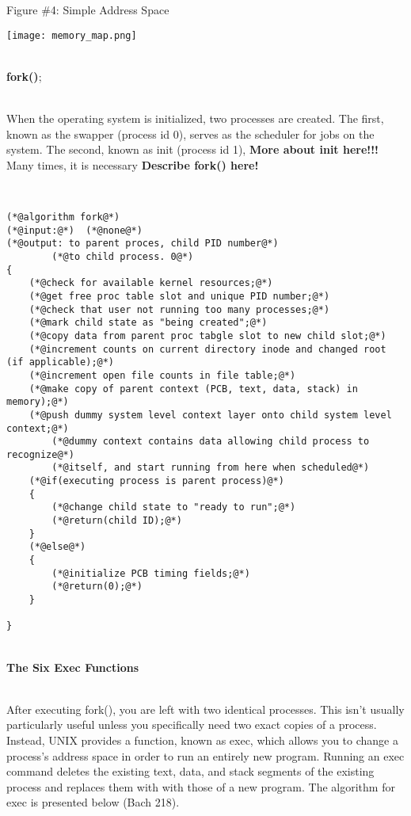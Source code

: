 \documentclass[12pt]{extarticle}
\newenvironment{myindentpar}[1]%
 {\begin{list}{}%
         {\setlength{\leftmargin}{#1}}%
         \item[]%
 }
 {\end{list}}
\begin{document}
\newpage
\begin{center}
    Figure \#4: Simple Address Space
\end{center}
\begin{center}
    \texttt{[image: memory\_map.png]}
\end{center}


\begin{myindentpar}{5mm}
    
    \ \\
    \textbf{fork()};
    
    \ \\
    When the operating system is initialized, two processes are created.  The first, known as the swapper (process id 0), serves as the scheduler for jobs on the system.  The second, known as init (process id 1), \textbf{More about init here!!!} 
    Many times, it is necessary 
    \textbf{Describe fork() here!}
    
    
\ \\
\begin{lstlisting}[frame=single]
(*@algorithm fork@*)
(*@input:@*)  (*@none@*)
(*@output: to parent proces, child PID number@*)
        (*@to child process. 0@*)
{
    (*@check for available kernel resources;@*)
    (*@get free proc table slot and unique PID number;@*)
    (*@check that user not running too many processes;@*)
    (*@mark child state as "being created";@*)
    (*@copy data from parent proc tabgle slot to new child slot;@*)
    (*@increment counts on current directory inode and changed root (if applicable);@*)
    (*@increment open file counts in file table;@*)
    (*@make copy of parent context (PCB, text, data, stack) in memory);@*)
    (*@push dummy system level context layer onto child system level context;@*)
        (*@dummy context contains data allowing child process to recognize@*)
        (*@itself, and start running from here when scheduled@*)
    (*@if(executing process is parent process)@*)
    {
        (*@change child state to "ready to run";@*)
        (*@return(child ID);@*)
    }
    (*@else@*)
    {
        (*@initialize PCB timing fields;@*)
        (*@return(0);@*)
    }

}
\end{lstlisting}
    
    \ \\
    \textbf{The Six Exec Functions}
    
    \ \\
    After executing fork(), you are left with two identical processes.  This isn't usually particularly useful unless you specifically need two exact copies of a process.  Instead, UNIX provides a function, known as exec, which allows you to change a process's address space in order to run an entirely new program.  Running an exec command deletes the existing text, data, and stack segments of the existing process and replaces them with with those of a new program.  The algorithm for exec is presented below (Bach 218).  
    

\end{myindentpar}
\end{document}
